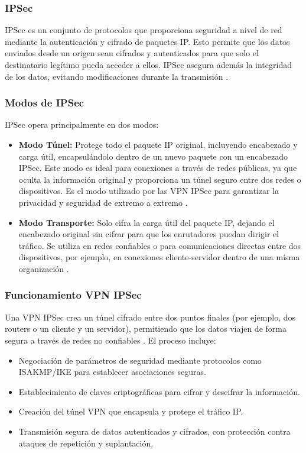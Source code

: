 \subsubsection{IPSec}
IPSec es un conjunto de protocolos que proporciona seguridad a nivel de red mediante la autenticación y cifrado de paquetes IP. Esto permite que los datos enviados desde 
un origen sean cifrados y autenticados para que solo el destinatario legítimo pueda acceder a ellos. IPSec asegura además la integridad de los datos, evitando modificaciones 
durante la transmisión \cite{ipsec}.
\subsubsection{Modos de IPSec}
IPSec opera principalmente en dos modos:
\begin{itemize}
    \item \textbf{Modo Túnel:} Protege todo el paquete IP original, incluyendo encabezado y carga útil, encapsulándolo dentro de un nuevo paquete con un encabezado IPSec. 
    Este modo es ideal para conexiones a través de redes públicas, ya que oculta la información original y proporciona un túnel seguro entre dos redes o dispositivos. 
    Es el modo utilizado por las VPN IPSec para garantizar la privacidad y seguridad de extremo a extremo \cite{ipsec}.
    \item \textbf{Modo Transporte:} Solo cifra la carga útil del paquete IP, dejando el encabezado original sin cifrar para que los enrutadores puedan dirigir el tráfico. 
    Se utiliza en redes confiables o para comunicaciones directas entre dos dispositivos, por ejemplo, en conexiones cliente-servidor dentro de una misma organización \cite{ipsec}.
\end{itemize}
\subsubsection{Funcionamiento VPN IPSec}
Una VPN IPSec crea un túnel cifrado entre dos puntos finales (por ejemplo, dos routers o un cliente y un servidor), permitiendo que los datos viajen de forma segura a través de redes 
no confiables \cite{ipsec}. El proceso incluye:
\begin{itemize}
    \item Negociación de parámetros de seguridad mediante protocolos como ISAKMP/IKE para establecer asociaciones seguras.
    \item Establecimiento de claves criptográficas para cifrar y descifrar la información.
    \item Creación del túnel VPN que encapsula y protege el tráfico IP.
    \item Transmisión segura de datos autenticados y cifrados, con protección contra ataques de repetición y suplantación.
\end{itemize}

